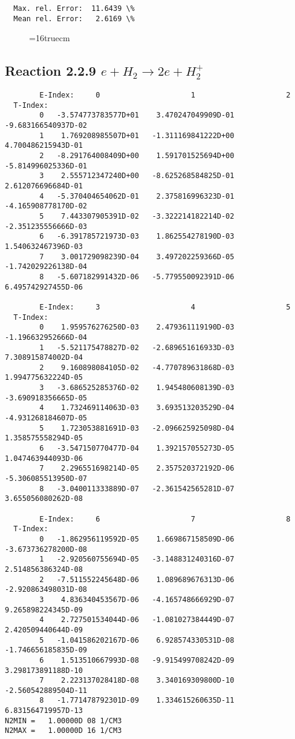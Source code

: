 \documentclass[12pt,dvipdfmx]{article}
\begin{document}
\begin{small}
\begin{verbatim}
  Max. rel. Error:  11.6439 \%
  Mean rel. Error:   2.6169 \%
\end{verbatim}\end{small}
\begin{figure} \label{2.2.5g}
\epsfxsize=16truecm
\end{figure}
\newpage


\subsection{
Reaction 2.2.9  $  e + H_2       \rightarrow 2e + H_2^+  $
}



\begin{small}\begin{verbatim}
        E-Index:     0                     1                     2
  T-Index:
        0   -3.574773783577D+01    3.470247049909D-01   -9.683166540937D-02
        1    1.769208985507D+01   -1.311169841222D+00    4.700486215943D-01
        2   -8.291764008409D+00    1.591701525694D+00   -5.814996025336D-01
        3    2.555712347240D+00   -8.625268584825D-01    2.612076696684D-01
        4   -5.370404654062D-01    2.375816996323D-01   -4.165908778170D-02
        5    7.443307905391D-02   -3.322214182214D-02   -2.351235556666D-03
        6   -6.391785721973D-03    1.862554278190D-03    1.540632467396D-03
        7    3.001729098239D-04    3.497202259366D-05   -1.742029226138D-04
        8   -5.607182991432D-06   -5.779550092391D-06    6.495742927455D-06

        E-Index:     3                     4                     5
  T-Index:
        0    1.959576276250D-03    2.479361119190D-03   -1.196632952666D-04
        1   -5.521175478827D-02   -2.689651616933D-03    7.308915874002D-04
        2    9.160898084105D-02   -4.770789631868D-03    1.994775632224D-05
        3   -3.686525285376D-02    1.945480608139D-03   -3.690918356665D-05
        4    1.732469114063D-03    3.693513203529D-04   -4.931268184607D-05
        5    1.723053881691D-03   -2.096625925098D-04    1.358575558294D-05
        6   -3.547150770477D-04    1.392157055273D-05    1.047463944093D-06
        7    2.296551698214D-05    2.357520372192D-06   -5.306085513950D-07
        8   -3.040011333889D-07   -2.361542565281D-07    3.655056080262D-08

        E-Index:     6                     7                     8
  T-Index:
        0   -1.862956119592D-05    1.669867158509D-06   -3.673736278200D-08
        1   -2.920560755694D-05   -3.148831240316D-07    2.514856386324D-08
        2   -7.511552245648D-06    1.089689676313D-06   -2.920863498031D-08
        3    4.836340453567D-06   -4.165748666929D-07    9.265898224345D-09
        4    2.727501534044D-06   -1.081027384449D-07    2.420509440644D-09
        5   -1.041586202167D-06    6.928574330531D-08   -1.746656185835D-09
        6    1.513510667993D-08   -9.915499708242D-09    3.298173891188D-10
        7    2.223137028418D-08    3.340169309800D-10   -2.560542889504D-11
        8   -1.771478792301D-09    1.334615260635D-11    6.831564719957D-13
N2MIN =   1.00000D 08 1/CM3
N2MAX =   1.00000D 16 1/CM3


\end{verbatim}
\end{small}
\end{document}
